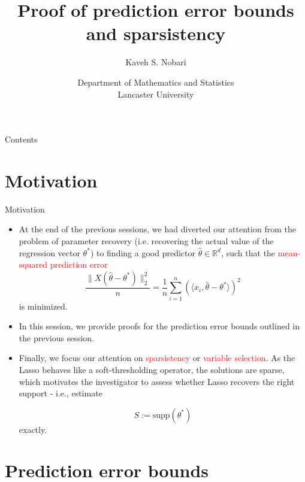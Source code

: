 \documentclass[10pt,handout,english]{beamer}
\title[]{Proof of prediction error bounds and sparsistency}
\author[Kaveh S. Nobari]{Kaveh S. Nobari}
\institute[]{Lectures in High-Dimensional Statistics}
\date[27/10/2020]
{Department of Mathematics and Statistics\\ Lancaster University}
\newcommand{\R}{\mathbb{R}}
\begin{document}
\begin{frame}
\titlepage
\end{frame}

\begin{frame}{Contents}
\tableofcontents
\end{frame}
\section{Motivation}
\begin{frame}[allowframebreaks]{Motivation}
\begin{itemize}
\item At the end of the previous sessions, we had diverted our attention from the problem of parameter recovery (i.e. recovering the actual value of the regression vector $\theta^*$) to finding a good predictor $\hat{\theta}\in\R^d$, such that the \textcolor{red}{mean-squared prediction error} \justifying
\[
\frac{\lVert X(\hat{\theta}-\theta^*)\rVert_2^2}{n}=\frac{1}{n}\sum\limits_{i=1}^{n}\left(\langle x_i,\hat{\theta}-\theta^*\rangle\right)^2
\]
is minimized.
\item In this session, we provide proofs for the prediction error bounds outlined in the previous session.\justifying 
\item Finally, we focus our attention on \textcolor{red}{sparsistency} or \textcolor{red}{variable selection}. As the Lasso behaves like a soft-thresholding operator, the solutions are sparse, which motivates the investigator to assess whether Lasso recovers the right support - i.e., estimate\justifying 

\[
S:=\text{supp}\left(\theta^*\right) 
\]
exactly.
\end{itemize}  
\end{frame}

\section{Prediction error bounds}
\end{document}
